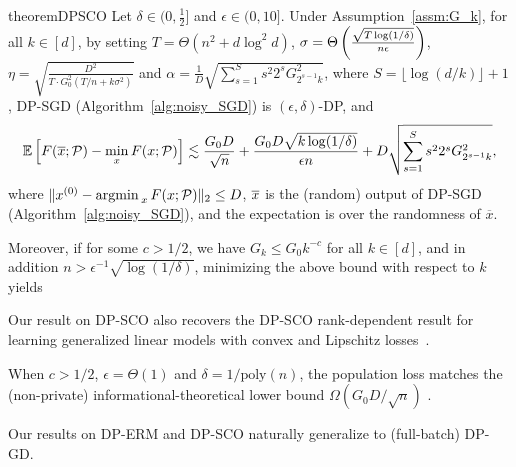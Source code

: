 \begin{restatable}{theorem}{DPSCO}
\label{thm:DPSCO}
Let $ \delta \in (0, \frac{1}{2}]$ and $\epsilon\in (0,10]$.
Under Assumption~\ref{assm:G_k}, for all $k \in [d]$, 
by setting
$T=\Theta(n^2 + d \log^2 d)$,
$\sigma=\Theta \left( \frac{\sqrt{T\log(1/\delta)}}{n\epsilon} \right)$, 
$\eta=\sqrt{\frac{D^{2}}{T\cdot G_{0}^{2}(T/n+k\sigma^{2})}}$
and $\alpha=\frac{1}{D}\sqrt{\sum_{s=1}^S s^2 2^{s}G_{2^{s-1}k}^{2}}$, where $S = \lfloor \log(d/k) \rfloor + 1$, 
DP-SGD (Algorithm~\ref{alg:noisy_SGD}) is $(\epsilon,\delta)$-DP, and
\begin{align*}
\mathbb{E} \left[
    F(\overline{x}; \mathcal P) - \min_{x} F(x; \mathcal P)
\right]
\lesssim
    \frac{G_0D}{\sqrt{n}}+\frac{G_{0}D\sqrt{k\log(1/\delta)}}{\epsilon n}+D\sqrt{\sum_{s=1}^{S}s^2 2^{s}G_{2^{s-1}k}^{2}},
\end{align*}
where $\|x^{(0)}- \mathop{\mathrm{argmin\,}}_x F(x ; \mathcal P) \|_2 \le D$, $\overline{x}$ is the (random) output of DP-SGD (Algorithm~\ref{alg:noisy_SGD}), and the expectation is over the randomness of $\overline{x}$.

Moreover, if for some $c>1/2$, we have $G_k\leq G_0 k^{-c}$ for all $k \in [d]$, and in addition $n>\epsilon^{-1}\sqrt{\log(1/\delta)}$, minimizing the above bound with respect to $k$ yields
\end{restatable}

\begin{remark}
Our result on DP-SCO also recovers the DP-SCO rank-dependent result for learning generalized linear models with convex and Lipschitz losses~\citep{song2021evading}.
\end{remark}

\begin{remark}
When $c>1/2$, $\epsilon = \Theta(1)$ and $\delta = 1/\mathrm{poly}(n)$, the population loss matches the (non-private) informational-theoretical lower bound $\Omega(G_0 D/\sqrt{n})$ \citep{agarwal2009information}.
\end{remark}

\begin{remark}
    Our results on DP-ERM and DP-SCO naturally generalize to (full-batch) DP-GD.
\end{remark}

